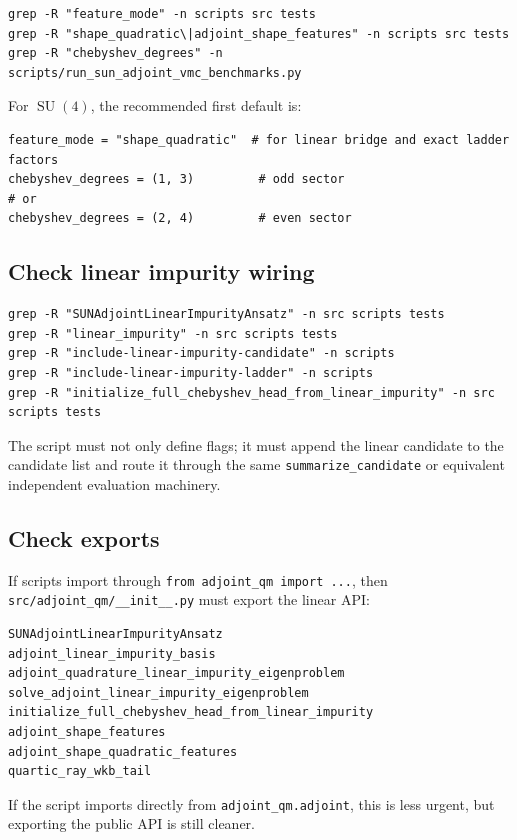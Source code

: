 \documentclass[11pt]{article}
\newcommand{\SU}{\operatorname{SU}}
\begin{document}
\begin{lstlisting}[style=bashstyle]
grep -R "feature_mode" -n scripts src tests
grep -R "shape_quadratic\|adjoint_shape_features" -n scripts src tests
grep -R "chebyshev_degrees" -n scripts/run_sun_adjoint_vmc_benchmarks.py
\end{lstlisting}

For \(\SU(4)\), the recommended first default is:
\begin{lstlisting}[style=pythonstyle]
feature_mode = "shape_quadratic"  # for linear bridge and exact ladder factors
chebyshev_degrees = (1, 3)         # odd sector
# or
chebyshev_degrees = (2, 4)         # even sector
\end{lstlisting}

\subsection{Check linear impurity wiring}

\begin{lstlisting}[style=bashstyle]
grep -R "SUNAdjointLinearImpurityAnsatz" -n src scripts tests
grep -R "linear_impurity" -n src scripts tests
grep -R "include-linear-impurity-candidate" -n scripts
grep -R "include-linear-impurity-ladder" -n scripts
grep -R "initialize_full_chebyshev_head_from_linear_impurity" -n src scripts tests
\end{lstlisting}

The script must not only define flags; it must append the linear candidate to the candidate list and route it through the same \texttt{summarize\_candidate} or equivalent independent evaluation machinery.

\subsection{Check exports}

If scripts import through \texttt{from adjoint\_qm import ...}, then \texttt{src/adjoint\_qm/\_\_init\_\_.py} must export the linear API:

\begin{lstlisting}[style=pythonstyle]
SUNAdjointLinearImpurityAnsatz
adjoint_linear_impurity_basis
adjoint_quadrature_linear_impurity_eigenproblem
solve_adjoint_linear_impurity_eigenproblem
initialize_full_chebyshev_head_from_linear_impurity
adjoint_shape_features
adjoint_shape_quadratic_features
quartic_ray_wkb_tail
\end{lstlisting}

If the script imports directly from \texttt{adjoint\_qm.adjoint}, this is less urgent, but exporting the public API is still cleaner.
\end{document}
